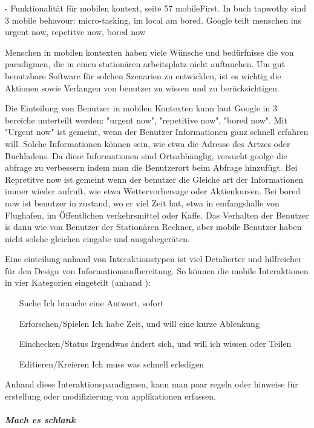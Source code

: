 - Funktionalität für mobilen kontext, seite 57 mobileFirst. In buch tapwothy sind 3 mobile behavour: micro-tasking, im local am bored. Google teilt menschen ins urgent now, repetitve now, bored now

Menschen in mobilen kontexten haben viele Wünsche und bedürfnisse die von paradigmen, die in einen stationären arbeitsplatz nicht auftauchen. Um gut benutzbare Software für solchen Szenarien zu entwicklen, ist es wichtig die Aktionen sowie Verlangen von benutzer zu wissen und zu berücksichtigen. 

Die Einteilung von Benutzer in mobilen Kontexten kann laut Google in 3 bereiche unterteilt werden: "urgent now", "repetitive now", "bored now"\cite{googleUsers}. Mit "Urgent now" ist gemeint, wenn der Benutzer Informationen ganz schnell erfahren will. Solche Informationen können sein, wie etwa die Adresse des Artzes oder Buchladens. Da diese Informationen sind Ortsabhänglig, versucht goolge die abfrage zu verbessern indem man die Benutzerort beim Abfrage hinzufügt. Bei Repretitve now ist gemeint wenn der benutzer die Gleiche art der Informationen immer wieder aufruft, wie etwa Wettervorhersage oder Aktienkursen. Bei bored now ist benutzer in zustand, wo er viel Zeit hat, etwa in emfangshalle von Flughafen, im Öffentlichen verkehrsmittel  oder Kaffe. Das Verhalten der Benutzer is dann wie von Benutzer der Stationären Rechner, aber mobile Benutzer haben nicht solche gleichen eingabe und ausgabegeräten.

Eine einteilung anhand von Interaktionstypen ist viel Detalierter und hilfreicher für den Design von Informationsaufbereitung. So können die mobile Interaktionen in vier Kategorien eingeteilt (anhand \cite[Seite 50]{mobileFirst}):

\begin{itemize}
 	\item[Suche] Ich brauche eine Antwort, sofort
 	\item[Erforschen/Spielen] Ich habe Zeit, und will eine kurze Ablenkung
 	\item[Einchecken/Status] Irgendwas ändert sich, und will ich wissen oder Teilen
 	\item[Editieren/Kreieren] Ich muss was schnell erledigen
 \end{itemize} 

Anhand diese Interaktionsparadigmen, kann man paar regeln oder hinweise für erstellung oder modifizierung von applikationen erfassen.

\subparagraph{Mach es schlank} 
\label{subp:entferne_das_fett}

